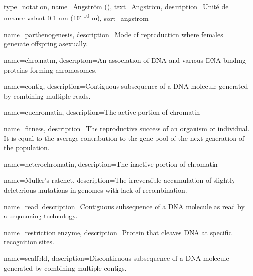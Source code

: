 



{
	type=notation,
	name={Angstr\" om (\angstrom)},
    text=Angstr\" om,
	description={Unité de mesure valant 0.1 nm (10\textsuperscript{- 10} m)},
	sort={angstrom}
}

{
		name={parthenogenesis},
		description={Mode of reproduction where females generate offspring asexually.}
}

{
		name={chromatin},
		description={An association of DNA and various DNA-binding proteins forming chromosomes.}
}

{
	name={contig},
	description={Contiguous subsequence of a DNA molecule generated by combining multiple reads.}
}

{
		name={euchromatin},
		description={The active portion of chromatin}
}

{
		name={fitness},
		description={The reproductive success of an organism or individual.  It is equal to the average contribution to the gene pool of the next generation of the population.}
}

{
		name={heterochromatin},
		description={The inactive portion of chromatin}
}

{
		name={Muller's ratchet},
		description={The irreversible accumulation of slightly deleterious mutations in genomes with lack of recombination.}
}

{
	name={read},
	description={Contiguous subsequence of a DNA molecule as read by a sequencing technology.}
}

{
	name={restriction enzyme},
	description={Protein that cleaves DNA at specific recognition sites.}
}

{
	name={scaffold},
	description={Discontinuous subsequence of a DNA molecule generated by combining multiple contigs.}
}


